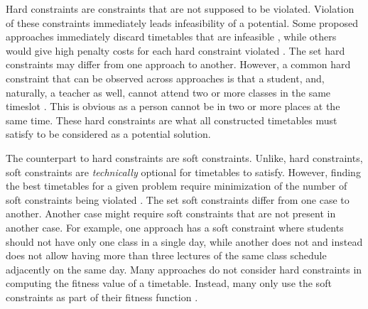 Hard constraints are constraints that are not supposed to be violated. Violation of these constraints immediately leads infeasibility of a potential. Some proposed approaches immediately discard timetables that are infeasible \cite{nlgd-landa-silva}\cite{nlgdrl-obit}, while others would give high penalty costs for each hard constraint violated \cite{supachate-noval-approach-ga-thai}. The set hard constraints may differ from one approach to another. However, a common hard constraint that can be observed across approaches is that a student, and, naturally, a teacher as well, cannot attend two or more classes in the same timeslot \cite{nlgd-landa-silva}\cite{bedoya-non-standard-ga}. This is obvious as a person cannot be in two or more places at the same time. These hard constraints are what all constructed timetables must satisfy to be considered as a potential solution.

The counterpart to hard constraints are soft constraints. Unlike, hard constraints, soft constraints are \textit{technically} optional for timetables to satisfy. However, finding the best timetables for a given problem require minimization of the number of soft constraints being violated \cite{nlgd-landa-silva}. The set soft constraints differ from one case to another. Another case might require soft constraints that are not present in another case. For example, one approach \cite{nlgdrl-obit} has a soft constraint where students should not have only one class in a single day, while another \cite{supachate-noval-approach-ga-thai} does not and instead does not allow having more than three lectures of the same class schedule adjacently on the same day.	Many approaches do not consider hard constraints in computing the fitness value of a timetable. Instead, many only use the soft constraints as part of their fitness function \cite{sanjay-an-application-of-ga}\cite{nlgdrl-obit}\cite{bedoya-non-standard-ga}.

